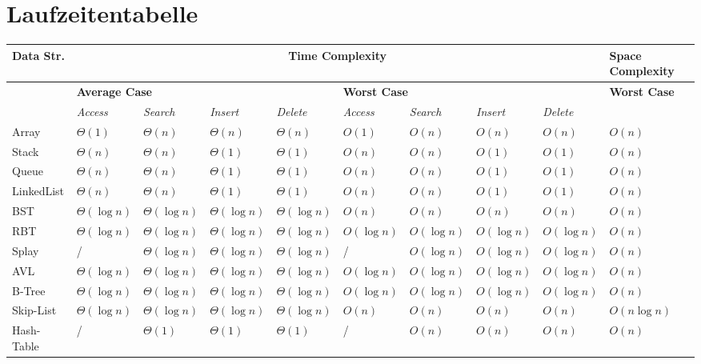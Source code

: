 \section{Laufzeitentabelle}

\begin{table}[h]
\scriptsize
\begin{tabularx}{\textwidth}{l | X X X X | X X X X | l}
    \toprule

    \textbf{Data Str.} & \multicolumn{8}{c|}{\textbf{Time Complexity}} & \textbf{Space Complexity} \\
    \midrule
    & \multicolumn{4}{l|}{\textbf{Average Case}} & \multicolumn{4}{l|}{\textbf{Worst Case}} & \textbf{Worst Case} \\ 
    \midrule
    & \textit{Access} & \textit{Search} & \textit{Insert} & \textit{Delete} & \textit{Access} & \textit{Search} & \textit{Insert} & \textit{Delete} & \\
    \midrule
    Array & $\Theta(1)$ & $\Theta(n)$ & $\Theta(n)$ & $\Theta(n)$ & $O(1)$ & $O(n)$ & $O(n)$ & $O(n)$ & $O(n)$ \\
    \midrule
    Stack & $\Theta(n)$ & $\Theta(n)$ & $\Theta(1)$ & $\Theta(1)$ & $O(n)$ & $O(n)$ & $O(1)$ & $O(1)$ & $O(n)$ \\
    \midrule
    Queue & $\Theta(n)$ & $\Theta(n)$ & $\Theta(1)$ & $\Theta(1)$ & $O(n)$ & $O(n)$ & $O(1)$ & $O(1)$ & $O(n)$ \\
    \midrule
    LinkedList & $\Theta(n)$ & $\Theta(n)$ & $\Theta(1)$ & $\Theta(1)$ & $O(n)$ & $O(n)$ & $O(1)$ & $O(1)$ & $O(n)$ \\
    \midrule
    BST & $\Theta(\log n)$ & $\Theta(\log n)$ & $\Theta(\log n)$ & $\Theta(\log n)$ & $O(n)$ & $O(n)$ & $O(n)$ & $O(n)$ & $O(n)$ \\
    \midrule
    RBT & $\Theta(\log n)$ & $\Theta(\log n)$ & $\Theta(\log n)$ & $\Theta(\log n)$ & $O(\log n)$ & $O(\log n)$ & $O(\log n)$ & $O(\log n)$  & $O(n)$ \\
    \midrule
    Splay & / & $\Theta(\log n)$ & $\Theta(\log n)$ & $\Theta(\log n)$ & / & $O(\log n)$ & $O(\log n)$ & $O(\log n)$  & $O(n)$ \\
    \midrule
    AVL & $\Theta(\log n)$ & $\Theta(\log n)$ & $\Theta(\log n)$ & $\Theta(\log n)$ & $O(\log n)$ & $O(\log n)$ & $O(\log n)$ & $O(\log n)$  & $O(n)$ \\
    \midrule
    B-Tree & $\Theta(\log n)$ & $\Theta(\log n)$ & $\Theta(\log n)$ & $\Theta(\log n)$ & $O(\log n)$ & $O(\log n)$ & $O(\log n)$ & $O(\log n)$  & $O(n)$ \\
    \midrule
    Skip-List & $\Theta(\log n)$ & $\Theta(\log n)$ & $\Theta(\log n)$ & $\Theta(\log n)$ & $O(n)$ & $O(n)$ & $O(n)$ & $O(n)$ & $O(n \log n)$ \\
    \midrule
    Hash-Table & / & $\Theta(1)$ & $\Theta(1)$ & $\Theta(1)$ & / & $O(n)$ & $O(n)$ & $O(n)$ & $O(n)$ \\
    \bottomrule
\end{tabularx}
\end{table}

